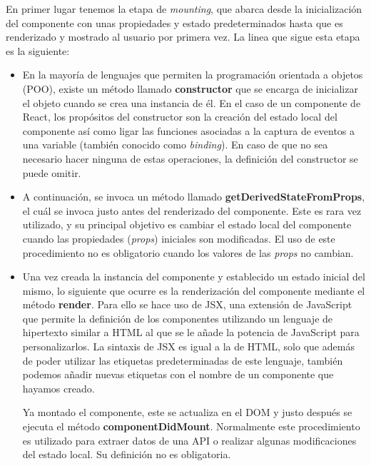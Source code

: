 \documentclass[../main.tex]{subfiles}
\begin{document}
    En primer lugar tenemos la etapa de \textit{mounting}, que abarca desde la inicialización del componente con unas propiedades y estado predeterminados hasta que es renderizado y mostrado al usuario por primera vez. La linea que sigue esta etapa es la siguiente: 
    
    
    \begin{itemize}
        \item  En la mayoría de lenguajes que permiten la programación orientada a objetos (POO), existe un método llamado \textbf{constructor} que se encarga de inicializar el objeto cuando se crea una instancia de él. En el caso de un componente de React, los propósitos del constructor son la creación del estado local del componente así como ligar las funciones asociadas a la captura de eventos a una variable (también conocido como \textit{binding}). En caso de que no sea necesario hacer ninguna de estas operaciones, la definición del constructor se puede omitir.
        
        \item A continuación, se invoca un método llamado \textbf{getDerivedStateFromProps}, el cuál se invoca justo antes del renderizado del componente. Este es rara vez utilizado, y su principal objetivo es cambiar el estado local del componente cuando las propiedades (\textit{props}) iniciales son modificadas. El uso de este procedimiento no es obligatorio cuando los valores de las \textit{props} no cambian.

        
        \item Una vez creada la instancia del componente y establecido un estado inicial del mismo, lo siguiente que ocurre es la renderización del componente mediante el método \textbf{render}. Para ello se hace uso de JSX, una extensión de JavaScript que permite la definición de los componentes utilizando un lenguaje de hipertexto similar a HTML al que se le añade la potencia de JavaScript para personalizarlos. La sintaxis de JSX es igual a la de HTML, solo que además de poder utilizar las etiquetas predeterminadas de este lenguaje, también podemos añadir nuevas etiquetas con el nombre de un componente que hayamos creado.
        
        Ya montado el componente, este se actualiza en el DOM y justo después se ejecuta el método \textbf{componentDidMount}. Normalmente este procedimiento es utilizado para extraer datos de una API o realizar algunas modificaciones del estado local. Su definición no es obligatoria.
        
    \end{itemize}
    
\end{document}
